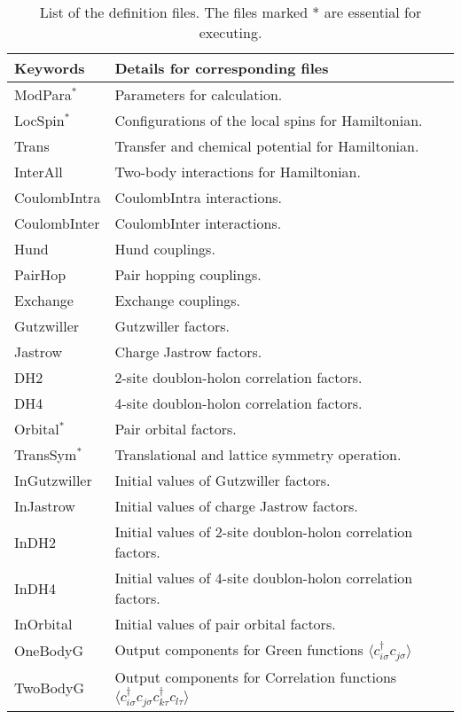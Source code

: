  \begin{table*}[h!]
\begin{center}
  \begin{tabular}{|ll|} \hline
           Keywords     & Details for corresponding files       \\   \hline\hline
           ModPara$^*$        &  Parameters for calculation.        \\ \hline 
           LocSpin$^*$          &  Configurations of the local spins for Hamiltonian.         \\ 
           Trans       &   Transfer and chemical potential for Hamiltonian.  \\
           InterAll  &   Two-body interactions for Hamiltonian. \\  
           CoulombIntra  &   CoulombIntra interactions. \\  
           CoulombInter  &   CoulombInter  interactions. \\  
           Hund  &   Hund couplings. \\  
           PairHop  &  Pair hopping couplings. \\  
           Exchange  &  Exchange couplings. \\  \hline
           Gutzwiller & Gutzwiller factors.\\
           Jastrow & Charge Jastrow factors.\\
           DH2 & 2-site doublon-holon correlation factors.\\
           DH4 & 4-site doublon-holon correlation factors.\\
           Orbital$^*$  & Pair orbital factors.\\
           TransSym$^*$  & Translational and lattice symmetry operation. \\ \hline
           InGutzwiller & Initial values of Gutzwiller factors.\\
           InJastrow & Initial values of charge Jastrow factors.\\
           InDH2 & Initial values of 2-site doublon-holon correlation factors.\\
           InDH4 & Initial values of 4-site doublon-holon correlation factors.\\
           InOrbital & Initial values of pair orbital factors.\\ \hline
           OneBodyG         &   Output components for Green functions $\langle c_{i\sigma}^{\dagger}c_{j\sigma}\rangle$           \\   
           TwoBodyG &   Output components for Correlation functions $\langle c_{i\sigma}^{\dagger}c_{j\sigma}c_{k\tau}^{\dagger}c_{l\tau}\rangle$  \\   \hline
  \end{tabular}
\end{center}
\caption{List of the definition files. The files marked * are essential for executing.}
\label{Table:Defs}
\end{table*}%
\newpage
~
\newpage
